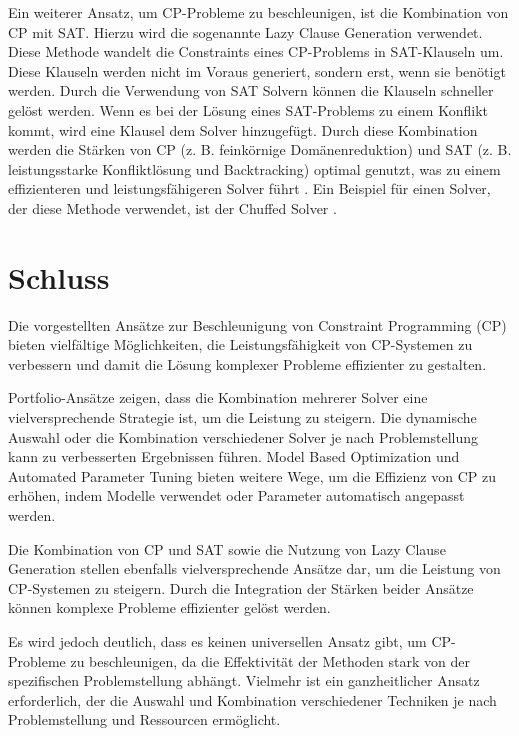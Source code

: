 Ein weiterer Ansatz, um CP-Probleme zu beschleunigen, ist die Kombination von CP
mit SAT. Hierzu wird die sogenannte Lazy Clause Generation verwendet. Diese
Methode wandelt die Constraints eines CP-Problems in SAT-Klauseln um. Diese
Klauseln werden nicht im Voraus generiert, sondern erst, wenn sie benötigt
werden. Durch die Verwendung von SAT Solvern können die Klauseln schneller
gelöst werden. Wenn es bei der Lösung eines SAT-Problems zu einem Konflikt
kommt, wird eine Klausel dem Solver hinzugefügt. Durch diese Kombination werden
die Stärken von CP (z. B. feinkörnige Domänenreduktion) und SAT (z. B.
leistungsstarke Konfliktlösung und Backtracking) optimal genutzt, was zu einem
effizienteren und leistungsfähigeren Solver führt \cite{stuck10bo}. Ein Beispiel
für einen Solver, der diese Methode verwendet, ist der Chuffed Solver
\cite{Chuff24co}.


  

  

\section{Schluss}
\label{sec:Schluss}
Die vorgestellten Ansätze zur Beschleunigung von Constraint Programming (CP)
bieten vielfältige Möglichkeiten, die Leistungsfähigkeit von CP-Systemen zu
verbessern und damit die Lösung komplexer Probleme effizienter zu gestalten.

Portfolio-Ansätze zeigen, dass die Kombination mehrerer Solver eine
vielversprechende Strategie ist, um die Leistung zu steigern. Die dynamische
Auswahl oder die Kombination verschiedener Solver je nach Problemstellung kann
zu verbesserten Ergebnissen führen. Model Based Optimization und Automated
Parameter Tuning bieten weitere Wege, um die Effizienz von CP zu erhöhen, indem
Modelle verwendet oder Parameter automatisch angepasst werden.

Die Kombination von CP und SAT sowie die Nutzung von Lazy Clause Generation
stellen ebenfalls vielversprechende Ansätze dar, um die Leistung von CP-Systemen
zu steigern. Durch die Integration der Stärken beider Ansätze können komplexe
Probleme effizienter gelöst werden.

Es wird jedoch deutlich, dass es keinen universellen Ansatz gibt, um CP-Probleme
zu beschleunigen, da die Effektivität der Methoden stark von der spezifischen
Problemstellung abhängt. Vielmehr ist ein ganzheitlicher Ansatz erforderlich,
der die Auswahl und Kombination verschiedener Techniken je nach Problemstellung
und Ressourcen ermöglicht.

